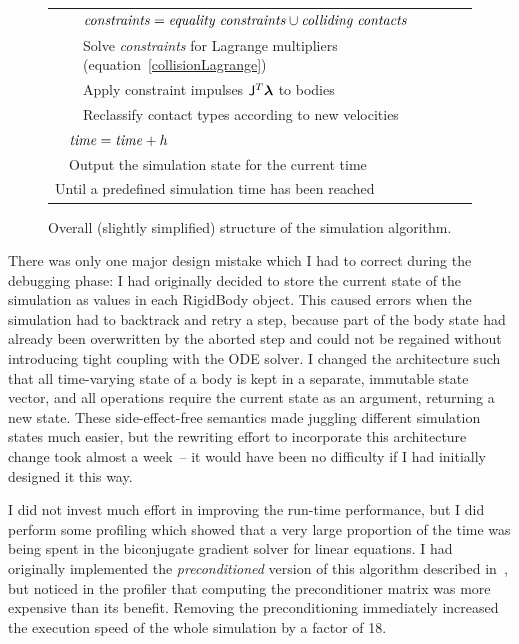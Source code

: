 \begin{figure}
\begin{tabular}{|l|l|l|l|@{}l}
        &&\multicolumn{2}{|l|}{$\mbox{\textit{constraints}} = \mbox{\textit{equality constraints}}
        \cup \mbox{\textit{colliding contacts}}$}\\\cline{3-4}
        &&\multicolumn{2}{|l|}{Solve \textit{constraints} for Lagrange multipliers
        (equation~\ref{collisionLagrange})}&
        \curly{\ref{collidingContact}}{\spx\spx\spx\spx\spx}\\\cline{3-4}
        &&\multicolumn{2}{|l|}{Apply constraint impulses $\m{J}^T\ve{\lambda}$ to bodies}\\\cline{3-4}
        &&\multicolumn{2}{|l|}{Reclassify contact types according to new velocities}\\\cline{2-4}
    &\multicolumn{3}{|l|}{$\mbox{\textit{time}} = \mbox{\textit{time}} + h$}\\\cline{2-4}
    &\multicolumn{3}{|l|}{Output the simulation state for the current time}\\\cline{2-4}
\multicolumn{4}{|l|}{Until a predefined simulation time has been reached}\\\cline{1-4}
\end{tabular}
\caption{Overall (slightly simplified) structure of the simulation algorithm.\label{flowchart}}
\end{figure}

There was only one major design mistake which I had to correct during the debugging phase: I had
originally decided to store the current state of the simulation as values in each
\textsf{RigidBody} object. This caused errors when the simulation had to backtrack and retry a
step, because part of the body state had already been overwritten by the aborted step and could
not be regained without introducing tight coupling with the ODE solver. I changed the architecture
such that all time-varying state of a body is kept in a separate, immutable state vector, and all
operations require the current state as an argument, returning a new state. These side-effect-free
semantics made juggling different simulation states much easier, but the rewriting effort
to incorporate this architecture change took almost a week~-- it would have been no difficulty
if I had initially designed it this way.

I did not invest much effort in improving the run-time performance, but I did perform some
profiling which showed that a very large proportion of the time was being spent in the biconjugate
gradient solver for linear equations. I had originally implemented the \emph{preconditioned}
version of this algorithm described in~\cite{NRinC}, but noticed in the profiler that computing
the preconditioner matrix was more expensive than its benefit. Removing the preconditioning
immediately increased the execution speed of the whole simulation by a factor of 18.


